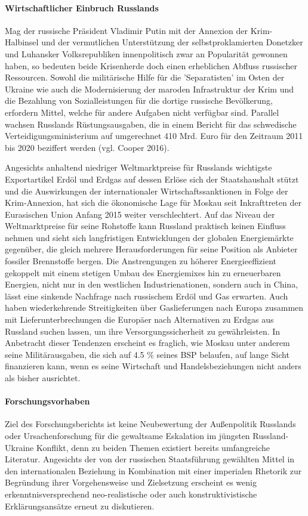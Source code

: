 \documentclass[11pt,a4paper]{article}
\begin{document}
\paragraph{Wirtschaftlicher Einbruch Russlands}
Mag der russische Präsident Vladimir Putin mit der Annexion der Krim-Halbinsel und der vermutlichen Unterstützung der selbstproklamierten Donetzker und Luhansker Volksrepubliken innenpolitisch zwar an Popularität gewonnen haben, so bedeuten beide Krisenherde doch einen erheblichen Abfluss russischer Ressourcen. Sowohl die militärische Hilfe für die 'Separatisten' im Osten der Ukraine wie auch die Modernisierung der maroden Infrastruktur der Krim und die Bezahlung von Sozialleistungen für die dortige russische Bevölkerung, erfordern Mittel, welche für andere Aufgaben nicht verfügbar sind. Parallel wachsen Russlands Rüstungsausgaben, die in einem Bericht für das schwedische Verteidigungsministerium auf umgerechnet 410 Mrd. Euro für den Zeitraum 2011 bis 2020 beziffert werden (vgl. Cooper 2016). 

Angesichts anhaltend niedriger Weltmarktpreise für Russlands wichtigste Exportartikel Erdöl und Erdgas auf dessen Erlöse sich der Staatshaushalt stützt und die Auswirkungen der internationaler Wirtschaftssanktionen in Folge der Krim-Annexion, hat sich die ökonomische Lage für Moskau seit Inkrafttreten der Eurasischen Union Anfang 2015 weiter verschlechtert. Auf das Niveau der Weltmarktpreise für seine Rohstoffe kann Russland praktisch keinen Einfluss nehmen und sieht sich langfristigen Entwicklungen der globalen Energiemärkte gegenüber, die gleich mehrere Herausforderungen für seine Position als Anbieter fossiler Brennstoffe bergen. Die Anstrengungen zu höherer Energieeffizient gekoppelt mit einem stetigen Umbau des Energiemixes hin zu erneuerbaren Energien, nicht nur in den westlichen Industrienationen, sondern auch in China, lässt eine sinkende Nachfrage nach russischem Erdöl und Gas erwarten. Auch haben wiederkehrende Streitigkeiten über Gaslieferungen nach Europa zusammen mit Lieferunterbrechungen die Europäer nach Alternativen zu Erdgas aus Russland suchen lassen, um ihre Versorgungssicherheit zu gewährleisten. In Anbetracht dieser Tendenzen erscheint es fraglich, wie Moskau unter anderem seine Militärausgaben, die sich auf 4.5 \% seines BSP belaufen, auf lange Sicht finanzieren kann, wenn es seine Wirtschaft und Handelsbeziehungen nicht anders als bisher ausrichtet.



\paragraph{Forschungsvorhaben}
Ziel des Forschungsberichts ist keine Neubewertung der Außenpolitik Russlands oder Ursachenforschung für die gewaltsame Eskalation im jüngsten Russland-Ukraine Konflikt, denn zu beiden Themen existiert bereits umfangreiche Literatur. Angesichts der von der russischen Staatsführung gewählten Mittel in den internationalen Beziehung in Kombination mit einer imperialen Rhetorik zur Begründung ihrer Vorgehensweise und Zielsetzung erscheint es wenig erkenntnisversprechend neo-realistische oder auch konstruktivistische Erklärungsansätze erneut zu diskutieren.
\end{document}
